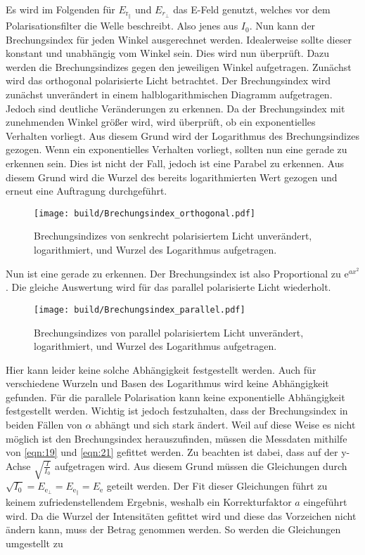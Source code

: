 \noindent Es wird im Folgenden für $E_{\text{r}_\parallel}$ und $E_{r_\bot}$ das E-Feld genutzt, welches vor dem Polarisationsfilter die Welle beschreibt. Also jenes aus $I_0$.
Nun kann der Brechungsindex für jeden Winkel ausgerechnet werden. Idealerweise sollte dieser konstant und unabhängig vom Winkel sein. Dies wird nun überprüft. Dazu werden 
die Brechungsindizes gegen den jeweiligen Winkel aufgetragen. Zunächst wird das orthogonal polarisierte Licht betrachtet.
Der Brechungsindex wird zunächst unverändert in einem halblogarithmischen Diagramm aufgetragen. Jedoch sind deutliche Veränderungen zu erkennen. 
Da der Brechungsindex mit zunehmenden Winkel größer wird, wird überprüft, ob ein exponentielles Verhalten vorliegt. Aus diesem Grund wird der Logarithmus 
des Brechungsindizes gezogen. Wenn ein exponentielles Verhalten vorliegt, sollten nun eine gerade zu erkennen sein. Dies ist nicht der Fall, jedoch ist eine Parabel zu erkennen. 
Aus diesem Grund wird die Wurzel des bereits logarithmierten Wert gezogen und erneut eine Auftragung durchgeführt. 

\begin{figure}[H]
    \centering
    \texttt{[image: build/Brechungsindex\_orthogonal.pdf]}
    \caption{Brechungsindizes von senkrecht polarisiertem Licht unverändert, logarithmiert, und Wurzel des Logarithmus aufgetragen.}
\end{figure}

\noindent Nun ist eine gerade zu erkennen. Der Brechungsindex ist also Proportional zu $\text{e}^{ax^2}$. Die gleiche Auswertung wird für das parallel polarisierte Licht 
wiederholt. 

\begin{figure}[H]
    \centering
    \texttt{[image: build/Brechungsindex\_parallel.pdf]}
    \caption{Brechungsindizes von parallel polarisiertem Licht unverändert, logarithmiert, und Wurzel des Logarithmus aufgetragen.}
\end{figure}

\noindent Hier kann leider keine solche Abhängigkeit festgestellt werden. Auch für verschiedene Wurzeln und Basen des Logarithmus wird keine Abhängigkeit gefunden.
Für die parallele Polarisation kann keine exponentielle Abhängigkeit festgestellt werden. 
Wichtig ist jedoch festzuhalten, dass der Brechungsindex in beiden Fällen von $\alpha$ abhängt und sich stark ändert. 
Weil auf diese Weise es nicht möglich ist den Brechungsindex herauszufinden, müssen die Messdaten mithilfe von \eqref{eqn:19} und \eqref{eqn:21} gefittet werden. 
Zu beachten ist dabei, dass auf der y-Achse $\sqrt{\frac{I}{I_0}}$ aufgetragen wird. Aus diesem Grund müssen die Gleichungen durch 
$\sqrt{I_0} = E_{\text{e}_\bot} = E_{\text{e}_\parallel} =  E_\text{e}$ geteilt werden.
Der Fit dieser Gleichungen führt zu keinem zufriedenstellendem Ergebnis, weshalb ein Korrekturfaktor $a$ eingeführt wird. Da die Wurzel der Intensitäten gefittet wird und diese 
das Vorzeichen nicht ändern kann, muss der Betrag genommen werden. So werden die Gleichungen umgestellt zu

